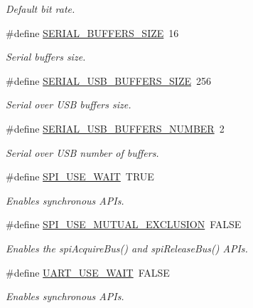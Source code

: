 \begin{DoxyCompactItemize}
\begin{DoxyCompactList}\small\item\em Default bit rate. \end{DoxyCompactList}\item 
\#define \hyperlink{group__HAL__CONF_ga81a9fb00c7a1ce0fe70f263d8fd820e8}{S\+E\+R\+I\+A\+L\+\_\+\+B\+U\+F\+F\+E\+R\+S\+\_\+\+S\+I\+ZE}~16
\begin{DoxyCompactList}\small\item\em Serial buffers size. \end{DoxyCompactList}\item 
\#define \hyperlink{group__HAL__CONF_ga24727a5407c6a41af53b59588592da80}{S\+E\+R\+I\+A\+L\+\_\+\+U\+S\+B\+\_\+\+B\+U\+F\+F\+E\+R\+S\+\_\+\+S\+I\+ZE}~256
\begin{DoxyCompactList}\small\item\em Serial over U\+SB buffers size. \end{DoxyCompactList}\item 
\#define \hyperlink{group__HAL__CONF_ga0c332b2493fd2106beb13425549120fe}{S\+E\+R\+I\+A\+L\+\_\+\+U\+S\+B\+\_\+\+B\+U\+F\+F\+E\+R\+S\+\_\+\+N\+U\+M\+B\+ER}~2
\begin{DoxyCompactList}\small\item\em Serial over U\+SB number of buffers. \end{DoxyCompactList}\item 
\#define \hyperlink{group__HAL__CONF_ga0c9ab1488423fa10a22f506c6e74b563}{S\+P\+I\+\_\+\+U\+S\+E\+\_\+\+W\+A\+IT}~T\+R\+UE
\begin{DoxyCompactList}\small\item\em Enables synchronous A\+P\+Is. \end{DoxyCompactList}\item 
\#define \hyperlink{group__HAL__CONF_ga36d1818f9631f955f7cc94629b1d5498}{S\+P\+I\+\_\+\+U\+S\+E\+\_\+\+M\+U\+T\+U\+A\+L\+\_\+\+E\+X\+C\+L\+U\+S\+I\+ON}~F\+A\+L\+SE
\begin{DoxyCompactList}\small\item\em Enables the {\ttfamily spi\+Acquire\+Bus()} and {\ttfamily spi\+Release\+Bus()} A\+P\+Is. \end{DoxyCompactList}\item 
\#define \hyperlink{group__HAL__CONF_ga3ccbb19b26b53ba0a8e40cb6b8650114}{U\+A\+R\+T\+\_\+\+U\+S\+E\+\_\+\+W\+A\+IT}~F\+A\+L\+SE
\begin{DoxyCompactList}\small\item\em Enables synchronous A\+P\+Is. \end{DoxyCompactList}\item 

\end{DoxyCompactItemize}
